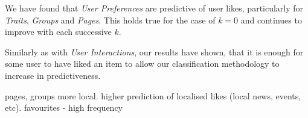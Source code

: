 We have found that \emph{User Preferences} are predictive of user likes, particularly for \emph{Traits}, \emph{Groups} and \emph{Pages}. This 
holds true for the case of $k = 0$ and continues to improve with each successive $k$.

Similarly as with \emph{User Interactions}, our results have shown, that it is enough for some user to have liked an item to allow our classification 
methodology to increase in predictiveness.

pages, groups more local. higher prediction of localised likes (local news, events, etc).
favourites - high frequency 

